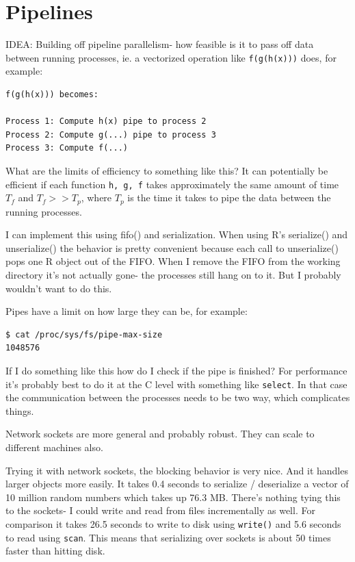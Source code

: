 \documentclass[12pt]{article}
\begin{document}
\section{Pipelines}

IDEA: Building off pipeline parallelism- how feasible is it to pass off
data between running processes, ie. a vectorized operation like
\texttt{f(g(h(x)))} does, for example:

\begin{verbatim}
f(g(h(x))) becomes:

Process 1: Compute h(x) pipe to process 2
Process 2: Compute g(...) pipe to process 3
Process 3: Compute f(...)
\end{verbatim}

What are the limits of efficiency to something like this? It can
potentially be
efficient if each function \texttt{h, g, f} takes approximately the same
amount of time $T_f$ and $T_f >> T_p$, where $T_p$ is the time it takes to
pipe the data between the running processes. 

I can implement this using fifo() and serialization. When using R's
serialize() and unserialize() the behavior is pretty convenient because
each call to unserialize() pops one R object out of the FIFO.
When I remove the FIFO from the working directory it's not actually gone-
the processes still hang on to it. But I probably wouldn't want to do this.

Pipes have a limit on how large they can be, for example:
\begin{verbatim}
$ cat /proc/sys/fs/pipe-max-size
1048576
\end{verbatim}

If I do something like this how do I check if the pipe is finished?
For performance it's probably best to do it at the C level with something
like \texttt{select}. In that case the communication between the processes
needs to be two way, which complicates things.

Network sockets are more general and probably robust. They can scale to
different machines also.

Trying it with network sockets, the blocking behavior is very nice. And it
handles larger objects more easily. It takes 0.4 seconds to serialize /
deserialize a vector of 10 million random numbers which takes up 76.3 MB.
There's nothing tying this to the sockets- I could write and read from
files incrementally as well.  For comparison it takes 26.5 seconds to write
to disk using \texttt{write()} and 5.6 seconds to read using \texttt{scan}.
This means that serializing over sockets is about 50 times faster than
hitting disk.
\end{document}
